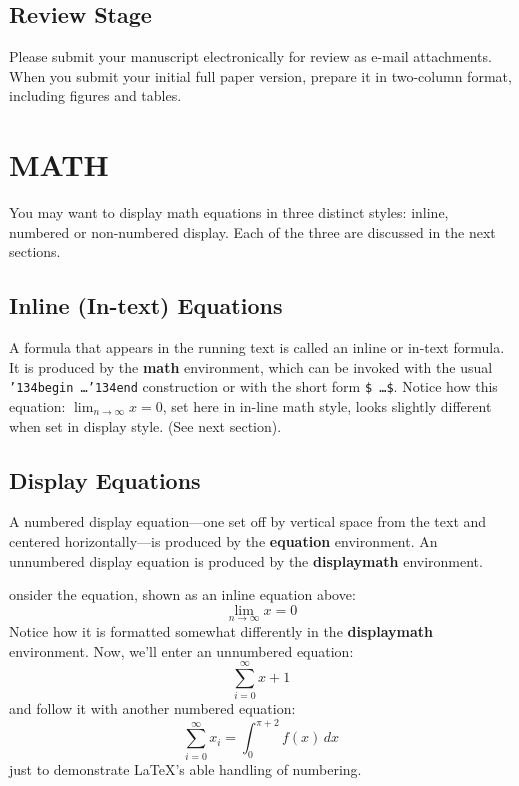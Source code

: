 \documentclass{cocseArticle}
\begin{document}
\subsection{Review Stage}
Please submit your manuscript electronically for review as e-mail attachments. When you submit your initial full paper version, prepare it in two-column format, including figures and tables. 



\section{MATH}
You may want to display math equations in three distinct styles:
inline, numbered or non-numbered display. Each of the three are
discussed in the next sections.

\subsection{Inline (In-text) Equations}
A formula that appears in the running text is called an inline or in-text formula.  It is produced by the \textbf{math} environment, which can be invoked with the usual \texttt{{\char'134}begin\,\ldots{\char'134}end} construction or with the short form \texttt{\$\,\ldots\$}.  Notice how this equation:
\begin{math}
\lim_{n\rightarrow \infty}x=0
\end{math}, set here in in-line math style, looks slightly different when set in display style.  (See next section).

\subsection{Display Equations}
A numbered display equation---one set off by vertical space from the text and centered horizontally---is produced by the \textbf{equation} environment. An unnumbered display equation is produced by the \textbf{displaymath} environment.

onsider the equation, shown as an inline equation above:
\begin{equation}
\lim_{n\rightarrow \infty}x=0
\end{equation}
Notice how it is formatted somewhat differently in
the \textbf{displaymath}
environment.  Now, we'll enter an unnumbered equation:
\begin{displaymath}
\sum_{i=0}^{\infty} x + 1
\end{displaymath}
and follow it with another numbered equation:
\begin{equation}
\sum_{i=0}^{\infty}x_i=\int_{0}^{\pi+2} f(x)\,dx
\end{equation}
just to demonstrate \LaTeX's able handling of numbering.
\end{document}

